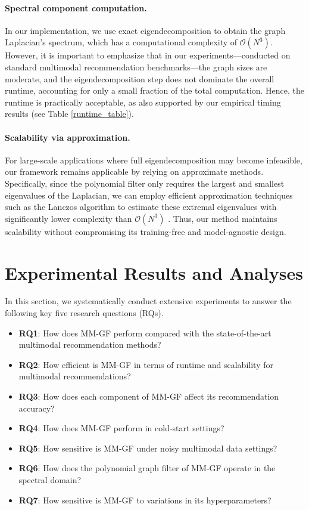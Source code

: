 \documentclass[a4paper,fleqn]{cas-sc}
\renewcommand{\cite}{\citep}
\begin{document}
\paragraph{Spectral component computation.} In our implementation, we use exact eigendecomposition to obtain the graph Laplacian's spectrum, which has a computational complexity of $\mathcal{O}(N^3)$. However, it is important to emphasize that in our experiments—conducted on standard multimodal recommendation benchmarks—the graph sizes are moderate, and the eigendecomposition step does not dominate the overall runtime, accounting for only a small fraction of the total computation. Hence, the runtime is practically acceptable, as also supported by our empirical timing results (see Table \ref{runtime_table}).

\paragraph{Scalability via approximation.} For large-scale applications where full eigendecomposition may become infeasible, our framework remains applicable by relying on approximate methods. Specifically, since the polynomial filter only requires the largest and smallest eigenvalues of the Laplacian, we can employ efficient approximation techniques such as the Lanczos algorithm \cite{cullum2002lanczos} to estimate these extremal eigenvalues with significantly lower complexity than $\mathcal{O}(N^3)$ \cite{arora2005fast}. Thus, our method maintains scalability without compromising its training-free and model-agnostic design.


\section{Experimental Results and Analyses}
\label{section 5}

In this section, we systematically conduct extensive experiments to answer the following key five research questions (RQs).

\begin{itemize}
    \item \textbf{RQ1}: How does \textsf{MM-GF} perform compared with the state-of-the-art multimodal recommendation methods? %
    \item \textbf{RQ2}: How efficient is \textsf{MM-GF} in terms of runtime and scalability for multimodal recommendations? %
    \item \textbf{RQ3}: How does each component of \textsf{MM-GF} affect its recommendation accuracy? %
    \item \textbf{RQ4}: How does \textsf{MM-GF} perform in cold-start settings? %
    \item \textbf{RQ5}: How sensitive is \textsf{MM-GF} under noisy multimodal data settings? %
    \item \textbf{RQ6}: How does the polynomial graph filter of \textsf{MM-GF} operate in the spectral domain?
    \item \textbf{RQ7}: How sensitive is \textsf{MM-GF} to variations in its hyperparameters?
\end{itemize}
\end{document}

